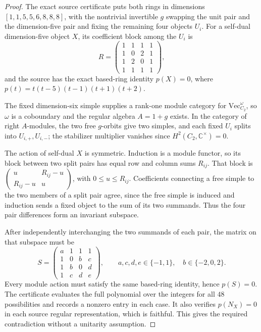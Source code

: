 \begin{proof}
The exact source certificate puts both rings in dimensions
$[1,1,5,5,6,8,8,8]$, with the nontrivial invertible $g$ swapping the
unit pair and the dimension-five pair and fixing the remaining four
objects $U_i$. For a self-dual dimension-five object $X$, its coefficient
block among the $U_i$ is
\[
 R=\begin{pmatrix}1&1&1&1\\1&0&2&1\\1&2&0&1\\1&1&1&1\end{pmatrix},
\]
and the source has the exact based-ring identity
$p(X)=0$, where $p(t)=t(t-5)(t-1)(t+1)(t+2)$.

The fixed dimension-six simple supplies a rank-one module category for
$\mathrm{Vec}_{C_2}^{\omega}$, so $\omega$ is a coboundary and the
regular algebra $A=1+g$ exists. In the category of right $A$-modules,
the two free $g$-orbits give two simples, and each fixed $U_i$ splits
into $U_{i,+},U_{i,-}$; the stabilizer multiplier vanishes since
$H^2(C_2,\mathbb C^\times)=0$.

The action of self-dual $X$ is symmetric. Induction is a module functor,
so its block between two split pairs has equal row and column sums
$R_{ij}$. That block is
$\left(\begin{smallmatrix}u&R_{ij}-u\\R_{ij}-u&u\end{smallmatrix}\right)$,
with $0\le u\le R_{ij}$. Coefficients connecting a free simple to the
two members of a split pair agree, since the free simple is induced
and induction sends a fixed object to the sum of its two summands.
Thus the four pair differences form an invariant subspace.

After independently interchanging the two summands of each pair, the
matrix on that subspace must be
\[
 S=\begin{pmatrix}a&1&1&1\\1&0&b&c\\1&b&0&d\\1&c&d&e\end{pmatrix},
 \qquad a,c,d,e\in\{-1,1\},\quad b\in\{-2,0,2\}.
\]
Every module action must satisfy the same based-ring identity, hence
$p(S)=0$. The certificate evaluates the full polynomial over the
integers for all $48$ possibilities and records a nonzero entry in
each case. It also verifies $p(N_X)=0$ in each source regular
representation, which is faithful. This gives the required contradiction
without a unitarity assumption.
\end{proof}
